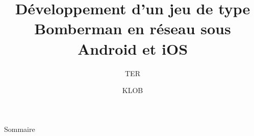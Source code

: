 \documentclass[11pt, sans,xcolor=table]{beamer}
\title{Développement d'un jeu de type Bomberman en réseau sous Android et iOS}
\author{KLOB}
\institute{Université Montpellier II}
\subtitle{TER}
\begin{document}
\begin{frame}
\titlepage
\end{frame}


\begin{frame}{Sommaire}
\setcounter{tocdepth}{1}
\tableofcontents
\end{frame}










\end{document}
